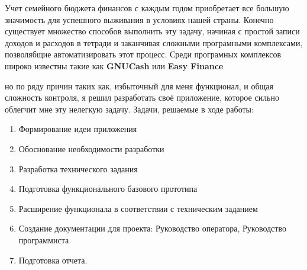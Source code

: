 Учет семейного бюджета финансов с каждым годом приобретает все большую значимость для успешного выживания в условиях нашей страны. Конечно существует множество способов выполнить эту задачу, начиная с простой
записи доходов и расходов в тетради и заканчивая сложными програмными
комплексами, позволябщие автоматизировать этот процесс. Среди програмных комплексов широко известны такие как \textbf{GNUCash} или \textbf{Easy Finance}

но по ряду причин таких как, избыточный для меня функционал, и общая сложность контроля, я решил разработать своё приложение, которое сильно облегчит мне эту нелегкую задачу.
Задачи, решаемые в ходе работы:
\begin{enumerate}
\item Формирование идеи приложения
\item Обоснование необходимости разработки
\item Разработка технического задания
\item Подготовка функционального базового прототипа
\item Расширение функционала в соответствии с техническим заданием
\item Создание документации для проекта: Руководство оператора, Руководство программиста
\item Подготовка отчета. 
\end{enumerate}
